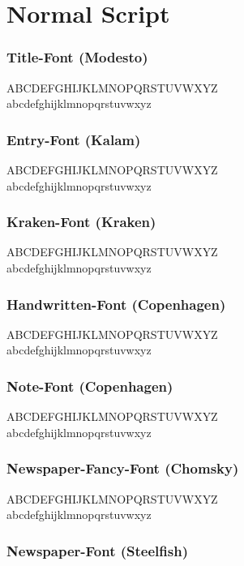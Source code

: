 \documentclass[letterpaper,openany,twoside,twocolumn]{book}
\begin{document}
	\chapter{Normal Script}
	
	\subsection{Title-Font (Modesto)}
	{\titlefont ABCDEFGHIJKLMNOPQRSTUVWXYZ}\\
	{\titlefont abcdefghijklmnopqrstuvwxyz}
	
	\subsection{Entry-Font (Kalam)}
	{\entryfont ABCDEFGHIJKLMNOPQRSTUVWXYZ}\\
	{\entryfont abcdefghijklmnopqrstuvwxyz}
	
	\subsection{Kraken-Font (Kraken)}
	{\krakenfont ABCDEFGHIJKLMNOPQRSTUVWXYZ}\\
	{\krakenfont abcdefghijklmnopqrstuvwxyz}
	
	\subsection{Handwritten-Font (Copenhagen)}
	{\handwrittenfont ABCDEFGHIJKLMNOPQRSTUVWXYZ}\\
	{\handwrittenfont abcdefghijklmnopqrstuvwxyz}
	\subsection{Note-Font (Copenhagen)}
	{\notefont ABCDEFGHIJKLMNOPQRSTUVWXYZ}\\
	{\notefont abcdefghijklmnopqrstuvwxyz}
	
	\subsection{Newspaper-Fancy-Font (Chomsky)}
	{\newspaperFancyHeaderFont ABCDEFGHIJKLMNOPQRSTUVWXYZ}\\
	{\newspaperFancyHeaderFont abcdefghijklmnopqrstuvwxyz}
	
	\subsection{Newspaper-Font (Steelfish)}
\end{document}
